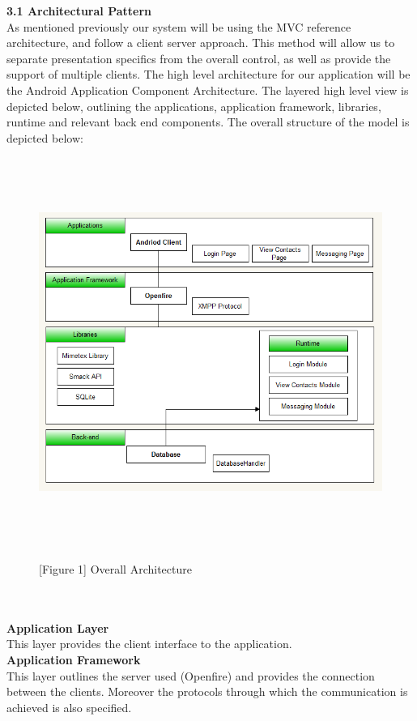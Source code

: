 \documentclass[29pt,a4paper]{moderncv}
\begin{document}
		\noindent \textbf{3.1 Architectural Pattern}
			\\As mentioned previously our system will be using the MVC reference architecture, and follow a client server approach. This method will allow us to separate presentation specifics from the overall control, as well as provide the support of multiple clients. The high level architecture for our application will be the Android Application Component Architecture.  The layered high level view is depicted below, outlining the applications, application framework, libraries, runtime  and relevant back end components. The overall structure of the model is depicted below:\\
\newpage
				\noindent\begin{figure}
				\centering
				\includegraphics[width=6.0in, height=5.0in]{./overall_arch.png}
				\\\caption{[Figure 1] Overall Architecture}
				\end{figure}\\ 
			\\ \noindent\textbf{Application Layer}\\
			This layer provides the client interface to the application.\\
			
			\noindent\textbf{Application Framework}\\
			This layer outlines the server used (Openfire) and provides the connection between the clients. Moreover the protocols through which the communication is achieved is also specified.\\
			
\end{document}
